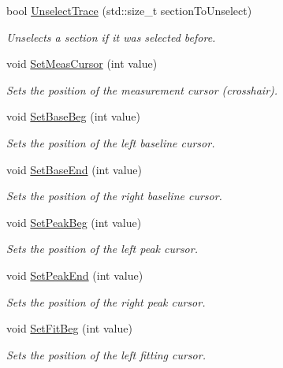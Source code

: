 \begin{DoxyCompactItemize}
bool \hyperlink{classRecording_ad70a4aeb0cdfd6be596abd0558cad1dd}{UnselectTrace} (std::size\_\-t sectionToUnselect)
\begin{DoxyCompactList}\small\item\em Unselects a section if it was selected before. \item\end{DoxyCompactList}\item 
void \hyperlink{classRecording_ae21fadb6207a21868be5656ac8f3463c}{SetMeasCursor} (int value)
\begin{DoxyCompactList}\small\item\em Sets the position of the measurement cursor (crosshair). \item\end{DoxyCompactList}\item 
void \hyperlink{classRecording_af919d796c5058582c95394b90f91e154}{SetBaseBeg} (int value)
\begin{DoxyCompactList}\small\item\em Sets the position of the left baseline cursor. \item\end{DoxyCompactList}\item 
void \hyperlink{classRecording_a79a9ce354c1395c1ecdaf3f2c7f4c303}{SetBaseEnd} (int value)
\begin{DoxyCompactList}\small\item\em Sets the position of the right baseline cursor. \item\end{DoxyCompactList}\item 
void \hyperlink{classRecording_a9e280b91e0c9debdc00795e4966a40d8}{SetPeakBeg} (int value)
\begin{DoxyCompactList}\small\item\em Sets the position of the left peak cursor. \item\end{DoxyCompactList}\item 
void \hyperlink{classRecording_a9bbe423cb9b243f81b755f2c98e3b368}{SetPeakEnd} (int value)
\begin{DoxyCompactList}\small\item\em Sets the position of the right peak cursor. \item\end{DoxyCompactList}\item 
void \hyperlink{classRecording_ab43387f7f75db7b7bc5de420ac883730}{SetFitBeg} (int value)
\begin{DoxyCompactList}\small\item\em Sets the position of the left fitting cursor. \item\end{DoxyCompactList}\item 

\end{DoxyCompactItemize}
